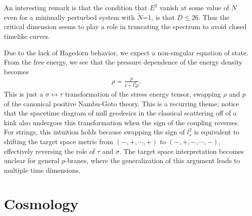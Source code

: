 \documentclass[%
 reprint,
 amsmath,amssymb,
 aps,
]{revtex4-1}
\begin{document}
An interesting remark is that the condition that $E^2$ vanish at some value of $N$ even for a
minimally perturbed system with $\tilde{N}$=1, is that $D \leq 26$. Thus the critical dimension
seems to play a role in truncating the spectrum to avoid closed timelike curves.

Due to the lack of Hagedorn behavior, we expect a non-singular equation of state.  From the free
energy, we see that the pressure dependence of the energy density becomes
\begin{eqnarray}
    \label{eos}
    \rho = \frac{p}{1+l_s^2 p} .
\end{eqnarray}
This is just a $\sigma \leftrightarrow \tau$ transformation of the stress energy tensor,
swapping $\rho$ and $p$ of the canonical positive Nambu-Goto theory. This is a recurring theme;
notice that the spacetime diagram of null geodesics in the classical scattering off of a kink
also undergoes this transformation when the sign of the coupling reverses.  For strings, this
intuition holds because swapping the sign of $l_s^2$ is equivalent to shifting the target space
metric from $(-,+, \cdots , +)$ to $(-,+,-, \cdots,-)$, effectively reversing the role of $\tau$ and
$\sigma$. The target space interpretation becomes unclear for general $p$-branes, where the
generalization of this argument leads to multiple time dimensions.

\section{Cosmology}
\end{document}
